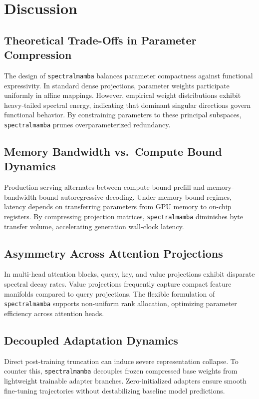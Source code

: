 \section{Discussion}

\subsection{Theoretical Trade-Offs in Parameter Compression}
The design of \texttt{spectralmamba} balances parameter compactness against functional expressivity. In standard dense projections, parameter weights participate uniformly in affine mappings. However, empirical weight distributions exhibit heavy-tailed spectral energy, indicating that dominant singular directions govern functional behavior. By constraining parameters to these principal subspaces, \texttt{spectralmamba} prunes overparameterized redundancy.

\subsection{Memory Bandwidth vs.\ Compute Bound Dynamics}
Production serving alternates between compute-bound prefill and memory-bandwidth-bound autoregressive decoding. Under memory-bound regimes, latency depends on transferring parameters from GPU memory to on-chip registers. By compressing projection matrices, \texttt{spectralmamba} diminishes byte transfer volume, accelerating generation wall-clock latency.

\subsection{Asymmetry Across Attention Projections}
In multi-head attention blocks, query, key, and value projections exhibit disparate spectral decay rates. Value projections frequently capture compact feature manifolds compared to query projections. The flexible formulation of \texttt{spectralmamba} supports non-uniform rank allocation, optimizing parameter efficiency across attention heads.

\subsection{Decoupled Adaptation Dynamics}
Direct post-training truncation can induce severe representation collapse. To counter this, \texttt{spectralmamba} decouples frozen compressed base weights from lightweight trainable adapter branches. Zero-initialized adapters ensure smooth fine-tuning trajectories without destabilizing baseline model predictions.

